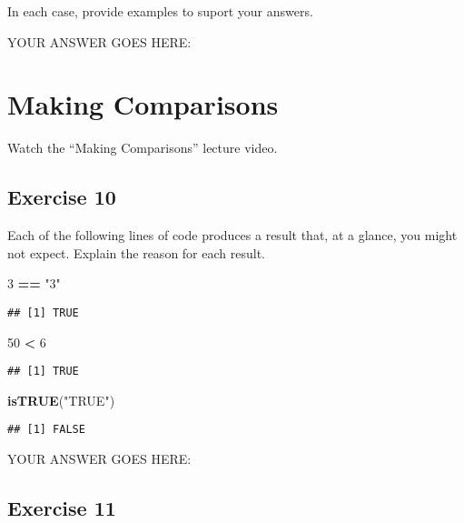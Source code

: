 \documentclass[
]{article}
\newenvironment{Shaded}{\begin{snugshade}}{\end{snugshade}}
\newcommand{\DecValTok}[1]{\textcolor[rgb]{0.00,0.00,0.81}{#1}}
\newcommand{\KeywordTok}[1]{\textcolor[rgb]{0.13,0.29,0.53}{\textbf{#1}}}
\newcommand{\NormalTok}[1]{#1}
\newcommand{\OperatorTok}[1]{\textcolor[rgb]{0.81,0.36,0.00}{\textbf{#1}}}
\newcommand{\StringTok}[1]{\textcolor[rgb]{0.31,0.60,0.02}{#1}}
\begin{document}
In each case, provide examples to suport your answers.

YOUR ANSWER GOES HERE:

\hypertarget{making-comparisons}{%
\section{Making Comparisons}\label{making-comparisons}}

Watch the ``Making Comparisons'' lecture video.

\hypertarget{exercise-10}{%
\subsection{Exercise 10}\label{exercise-10}}

Each of the following lines of code produces a result that, at a glance,
you might not expect. Explain the reason for each result.

\begin{Shaded}
\begin{Highlighting}[]
\DecValTok{3} \OperatorTok{==}\StringTok{ "3"}
\end{Highlighting}
\end{Shaded}

\begin{verbatim}
## [1] TRUE
\end{verbatim}

\begin{Shaded}
\begin{Highlighting}[]
\DecValTok{50} \OperatorTok{\textless{}}\StringTok{ \textquotesingle{}6\textquotesingle{}}
\end{Highlighting}
\end{Shaded}

\begin{verbatim}
## [1] TRUE
\end{verbatim}

\begin{Shaded}
\begin{Highlighting}[]
\KeywordTok{isTRUE}\NormalTok{(}\StringTok{"TRUE"}\NormalTok{)}
\end{Highlighting}
\end{Shaded}

\begin{verbatim}
## [1] FALSE
\end{verbatim}

YOUR ANSWER GOES HERE:

\hypertarget{exercise-11}{%
\subsection{Exercise 11}\label{exercise-11}}
\end{document}
